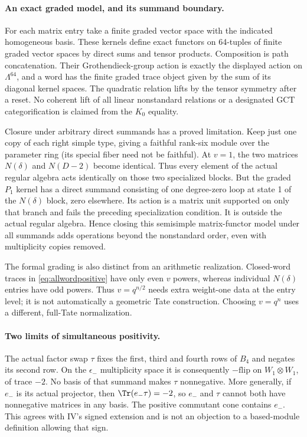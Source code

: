 \documentclass[11pt,a4paper]{article}
\theoremstyle{named}\newtheorem{finding}{Finding}[section]
\theoremstyle{definition}\newtheorem{definition}[finding]{Definition}
\theoremstyle{remark}\newtheorem{remark}[finding]{Remark}
\begin{document}
\paragraph{An exact graded model, and its summand boundary.}
For each matrix entry take a finite graded vector space with the
indicated homogeneous basis. These kernels define exact functors
on 64-tuples of finite graded vector spaces by direct sums and
tensor products. Composition is path concatenation. Their
Grothendieck-group action is exactly the displayed action on
$\Lambda^{64}$, and a word has the finite graded trace object
given by the sum of its diagonal kernel spaces.
The quadratic relation lifts by the tensor symmetry after a reset.
No coherent lift of all linear nonstandard relations or a
designated GCT categorification is claimed from the $K_0$ equality.

Closure under arbitrary direct summands has a proved limitation.
Keep just one copy of each right simple type, giving a faithful
rank-six module over the parameter ring (its special fiber need not
be faithful). At $v=1$, the two matrices $N(\delta)$
and $N(D-2)$ become identical. Thus every element of the actual
regular algebra acts identically on those two specialized blocks.
But the graded $P_1$ kernel has a direct summand consisting of
one degree-zero loop at state 1 of the $N(\delta)$ block, zero
elsewhere. Its action is a matrix unit supported on only that
branch and fails the preceding specialization condition.
It is outside the actual regular algebra. Hence closing this
semisimple matrix-functor model under all summands adds operations
beyond the nonstandard order, even with multiplicity copies removed.

The formal grading is also distinct from an arithmetic realization.
Closed-word traces in \eqref{eq:allwordpositive} have only even
$v$ powers, whereas individual $N(\delta)$ entries have odd powers.
Thus $v=q^{n/2}$ needs extra weight-one data at the entry level;
it is not automatically a geometric Tate construction.
Choosing $v=q^n$ uses a different, full-Tate normalization.

\paragraph{Two limits of simultaneous positivity.}
The actual factor swap $\tau$ fixes the first, third and fourth
rows of $B_4$ and negates its second row.
On the $\epsilon_-$ multiplicity space it is consequently
$-\mathrm{flip}$ on $W_1\otimes W_1$, of trace $-2$.
No basis of that summand makes $\tau$ nonnegative.
More generally, if $e_-$ is its actual projector, then
$\Tr(e_-\tau)=-2$, so $e_-$ and $\tau$ cannot both have
nonnegative matrices in any basis. The positive commutant cone
contains $e_-$. This agrees with IV's signed extension and is not
an objection to a based-module definition allowing that sign.
\end{document}
